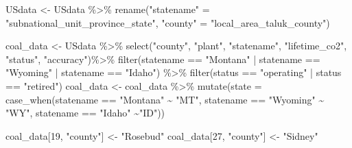 \documentclass[
]{article}
\newenvironment{Shaded}{\begin{snugshade}}{\end{snugshade}}
\newcommand{\AttributeTok}[1]{\textcolor[rgb]{0.77,0.63,0.00}{#1}}
\newcommand{\DecValTok}[1]{\textcolor[rgb]{0.00,0.00,0.81}{#1}}
\newcommand{\FunctionTok}[1]{\textcolor[rgb]{0.00,0.00,0.00}{#1}}
\newcommand{\NormalTok}[1]{#1}
\newcommand{\OtherTok}[1]{\textcolor[rgb]{0.56,0.35,0.01}{#1}}
\newcommand{\SpecialCharTok}[1]{\textcolor[rgb]{0.00,0.00,0.00}{#1}}
\newcommand{\StringTok}[1]{\textcolor[rgb]{0.31,0.60,0.02}{#1}}
\begin{document}
\begin{Shaded}
\begin{Highlighting}[]
\NormalTok{USdata }\OtherTok{\textless{}{-}}\NormalTok{ USdata }\SpecialCharTok{\%\textgreater{}\%} 
    \FunctionTok{rename}\NormalTok{(}\StringTok{"statename"} \OtherTok{=} \StringTok{"subnational\_unit\_province\_state"}\NormalTok{,}
           \StringTok{"county"} \OtherTok{=} \StringTok{"local\_area\_taluk\_county"}\NormalTok{)}

\NormalTok{coal\_data }\OtherTok{\textless{}{-}}\NormalTok{ USdata }\SpecialCharTok{\%\textgreater{}\%} \FunctionTok{select}\NormalTok{(}\StringTok{"county"}\NormalTok{, }\StringTok{"plant"}\NormalTok{, }\StringTok{"statename"}\NormalTok{, }\StringTok{"lifetime\_co2"}\NormalTok{, }\StringTok{"status"}\NormalTok{, }\StringTok{"accuracy"}\NormalTok{)}\SpecialCharTok{\%\textgreater{}\%} \FunctionTok{filter}\NormalTok{(statename }\SpecialCharTok{==} \StringTok{"Montana"} \SpecialCharTok{|}\NormalTok{ statename }\SpecialCharTok{==} \StringTok{"Wyoming"} \SpecialCharTok{|}\NormalTok{ statename }\SpecialCharTok{==} \StringTok{"Idaho"}\NormalTok{) }\SpecialCharTok{\%\textgreater{}\%} \FunctionTok{filter}\NormalTok{(status }\SpecialCharTok{==} \StringTok{"operating"} \SpecialCharTok{|}\NormalTok{ status }\SpecialCharTok{==} \StringTok{"retired"}\NormalTok{) }
\NormalTok{coal\_data }\OtherTok{\textless{}{-}}\NormalTok{ coal\_data }\SpecialCharTok{\%\textgreater{}\%} \FunctionTok{mutate}\NormalTok{(}\AttributeTok{state =} \FunctionTok{case\_when}\NormalTok{(statename }\SpecialCharTok{==} \StringTok{"Montana"} \SpecialCharTok{\textasciitilde{}} \StringTok{"MT"}\NormalTok{, statename }\SpecialCharTok{==} \StringTok{"Wyoming"} \SpecialCharTok{\textasciitilde{}} \StringTok{"WY"}\NormalTok{, statename }\SpecialCharTok{==} \StringTok{"Idaho"} \SpecialCharTok{\textasciitilde{}}\StringTok{"ID"}\NormalTok{))}

\NormalTok{coal\_data[}\DecValTok{19}\NormalTok{, }\StringTok{"county"}\NormalTok{] }\OtherTok{\textless{}{-}} \StringTok{"Rosebud"}
\NormalTok{coal\_data[}\DecValTok{27}\NormalTok{, }\StringTok{"county"}\NormalTok{] }\OtherTok{\textless{}{-}} \StringTok{"Sidney"}


\end{Highlighting}
\end{Shaded}
\end{document}
